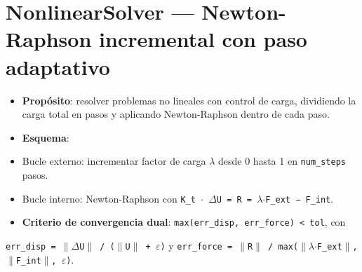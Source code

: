 \documentclass[11pt,letterpaper,oneside]{report}
\begin{document}
\section{NonlinearSolver --- Newton-Raphson incremental con paso adaptativo}

\begin{itemize}
  \item \textbf{Propósito}: resolver problemas no lineales con control de carga, dividiendo la carga total en pasos y aplicando Newton-Raphson dentro de cada paso.
  \item \textbf{Esquema}:
  \item Bucle externo: incrementar factor de carga \texttt{\ensuremath{\lambda}} desde 0 hasta 1 en \texttt{num\_steps} pasos.
  \item Bucle interno: Newton-Raphson con \texttt{K\_t \ensuremath{\cdot} \ensuremath{\Delta}U = R = \ensuremath{\lambda}\ensuremath{\cdot}F\_ext − F\_int}.
  \item \textbf{Criterio de convergencia dual}: \texttt{max(err\_disp, err\_force) < tol}, con
\end{itemize}
    \texttt{err\_disp = \ensuremath{\|}\ensuremath{\Delta}U\ensuremath{\|} / (\ensuremath{\|}U\ensuremath{\|} + \ensuremath{\varepsilon})} y \texttt{err\_force = \ensuremath{\|}R\ensuremath{\|} / max(\ensuremath{\|}\ensuremath{\lambda}\ensuremath{\cdot}F\_ext\ensuremath{\|}, \ensuremath{\|}F\_int\ensuremath{\|}, \ensuremath{\varepsilon})}.
\end{document}
